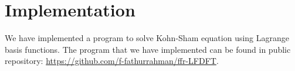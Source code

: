 \section{Implementation}

We have implemented a program to solve Kohn-Sham equation using Lagrange basis functions.
The program that we have implemented can be found in public repository:
\url{https://github.com/f-fathurrahman/ffr-LFDFT}.